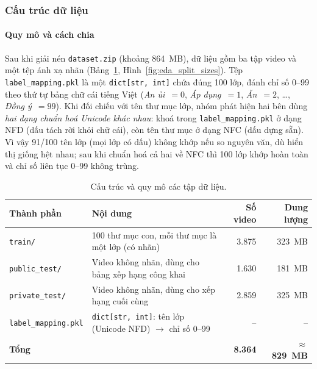 \subsubsection{Cấu trúc dữ liệu}
\label{subsec:eda_structure}

\paragraph{Quy mô và cách chia} Sau khi giải nén \texttt{dataset.zip} (khoảng 864~MB), dữ liệu gồm ba tập video và một tệp ánh xạ nhãn (Bảng~\ref{tab:eda_splits}, Hình~\ref{fig:eda_split_sizes}). Tệp \texttt{label\_mapping.pkl} là một \texttt{dict[str, int]} chứa đúng 100 lớp, đánh chỉ số 0--99 theo thứ tự bảng chữ cái tiếng Việt (\textit{An ủi}~$=0$, \textit{Áp dụng}~$=1$, \textit{Ăn}~$=2$, \ldots, \textit{Đồng ý}~$=99$). Khi đối chiếu với tên thư mục lớp, nhóm phát hiện hai bên dùng \emph{hai dạng chuẩn hoá Unicode khác nhau}: khoá trong \texttt{label\_mapping.pkl} ở dạng NFD (dấu tách rời khỏi chữ cái), còn tên thư mục ở dạng NFC (dấu dựng sẵn). Vì vậy 91/100 tên lớp (mọi lớp có dấu) không khớp nếu so nguyên văn, dù hiển thị giống hệt nhau; sau khi chuẩn hoá cả hai về NFC thì 100 lớp khớp hoàn toàn và chỉ số liên tục 0--99 không trùng.

\begin{table}[H]
  \centering
  \caption{Cấu trúc và quy mô các tập dữ liệu.}
  \label{tab:eda_splits}
  \begin{tabular}{@{}lp{}rr@{}}
    \toprule
    \textbf{Thành phần} & \textbf{Nội dung} & \textbf{Số video} & \textbf{Dung lượng} \\
    \midrule
    \texttt{train/}         & 100 thư mục con, mỗi thư mục là một lớp (có nhãn) & 3.875 & 323~MB \\
    \texttt{public\_test/}  & Video không nhãn, dùng cho bảng xếp hạng công khai & 1.630 & 181~MB \\
    \texttt{private\_test/} & Video không nhãn, dùng cho xếp hạng cuối cùng      & 2.859 & 325~MB \\
    \texttt{label\_mapping.pkl} & \texttt{dict[str, int]}: tên lớp (Unicode NFD) $\rightarrow$ chỉ số 0--99 & -- & -- \\
    \midrule
    \textbf{Tổng} & & \textbf{8.364} & $\approx$\textbf{829~MB} \\
    \bottomrule
  \end{tabular}
\end{table}

